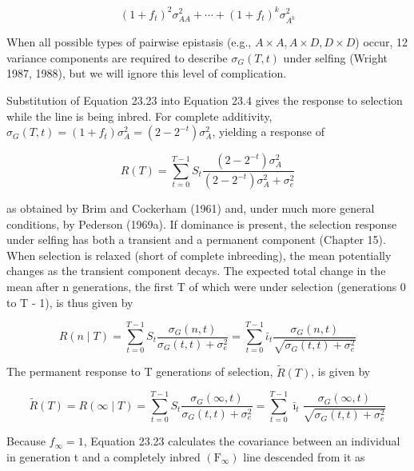 \documentclass{article}
\begin{document}
\begin{equation}
(1+f_{t})^{2}\sigma_{A A}^{2}+\cdots+(1+f_{t})^{k}\sigma_{A^{k}}^{2}
\end{equation}

When all possible types of pairwise epistasis (e.g.,  $ A \times A, A \times D, D \times D $) occur, 12 variance components are required to describe  $ \sigma_G(T, t) $ under selfing (Wright 1987, 1988), but we will ignore this level of complication.

Substitution of Equation 23.23 into Equation 23.4 gives the response to selection while the line is being inbred. For complete additivity,  $ \sigma_G(T,t) = (1 + f_t)\sigma_A^2 = (2 - 2^{-t})\sigma_A^2 $, yielding a response of

\begin{equation}
R(T)=\sum_{t=0}^{T-1}S_{t}\frac{(2-2^{-t})\sigma_{A}^{2}}{(2-2^{-t})\sigma_{A}^{2}+\sigma_{e}^{2}}
\tag{23.24}
\label{eq:23_24}
\end{equation}

as obtained by Brim and Cockerham (1961) and, under much more general conditions, by Pederson (1969a). If dominance is present, the selection response under selfing has both a transient and a permanent component (Chapter 15). When selection is relaxed (short of complete inbreeding), the mean potentially changes as the transient component decays. The expected total change in the mean after n generations, the first T of which were under selection (generations 0 to T - 1), is thus given by

\begin{equation}
R(n\mid T)=\sum_{t=0}^{T-1}S_{t}\frac{\sigma_{G}(n,t)}{\sigma_{G}(t,t)+\sigma_{e}^{2}}=\sum_{t=0}^{T-1}\bar{\iota}_{t}\frac{\sigma_{G}(n,t)}{\sqrt{\sigma_{G}(t,t)+\sigma_{e}^{2}}}
\tag{23.25}
\label{eq:23_25}
\end{equation}

The permanent response to T generations of selection,  $ \widetilde{R}(T) $, is given by

\begin{equation}
\widetilde{R}(T)=R(\infty\mid T)=\sum_{t=0}^{T-1}S_{t}\frac{\sigma_{G}(\infty,t)}{\sigma_{G}(t,t)+\sigma_{e}^{2}}=\sum_{t=0}^{T-1}\bar{\imath}_{t}\frac{\sigma_{G}(\infty,t)}{\sqrt{\sigma_{G}(t,t)+\sigma_{e}^{2}}}
\tag{23.26}
\label{eq:23_26}
\end{equation}

Because  $ f_{\infty} = 1 $, Equation 23.23 calculates the covariance between an individual in generation t and a completely inbred  $ (\mathrm{F}_{\infty}) $ line descended from it as
\end{document}
